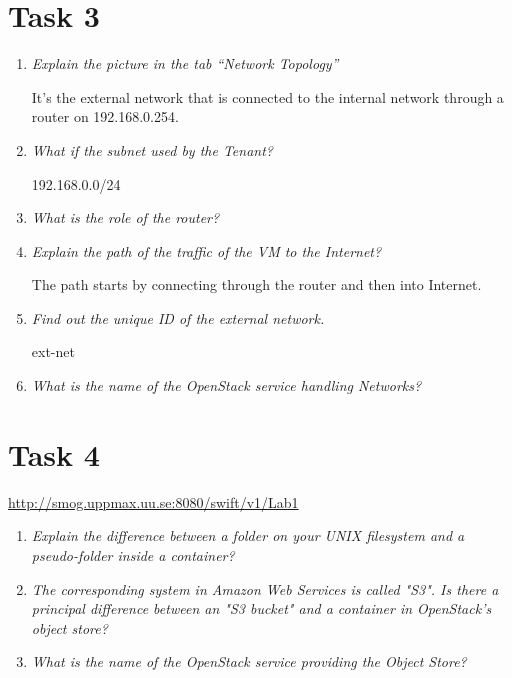 \documentclass[a4paper]{article}
\begin{document}
\section*{Task 3}

\begin{enumerate}
    \item \textit{Explain the picture in the tab ``Network Topology''}
    
    It's the external network that is connected to the internal network through a router on 192.168.0.254.
    \item \textit{What if the subnet used by the Tenant?}
    
    192.168.0.0/24
    \item \textit{What is the role of the router?}
    \item \textit{Explain the path of the traffic of the VM to the Internet?}
    
    The path starts by connecting through the router and then into Internet.
    \item \textit{Find out the unique ID of the external network.}
    
    ext-net
    \item \textit{What is the name of the OpenStack service handling Networks?}
\end{enumerate}

\section*{Task 4}
\url{http://smog.uppmax.uu.se:8080/swift/v1/Lab1}
\begin{enumerate}
    \item \textit{Explain the difference between a folder on your UNIX filesystem and a pseudo-folder inside a container?}
    \item \textit{The corresponding system in Amazon Web Services is called "S3". Is there a principal difference between an "S3 bucket" and a container in OpenStack's object store?}
    \item \textit{What is the name of the OpenStack service providing the Object Store?}
\end{enumerate}
\end{document}
